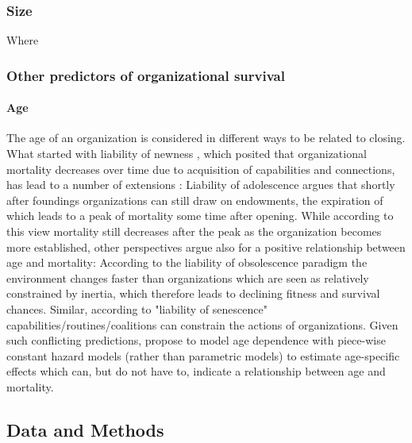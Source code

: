 \documentclass[12pt]{article}
\begin{document}
\subsubsection*{Size}


Where









\subsubsection*{Other predictors of organizational survival}

\paragraph*{Age}



The age of an organization is considered in different ways to be related to closing.
What started with liability of newness \parencite{Stinchcombe_1965_structure}, which posited that organizational mortality decreases over time due to acquisition of capabilities and connections, has lead to a number of extensions \parencite{Carroll_Khessina_2019_demography,Hannan_1998_mortality}:
Liability of adolescence argues that shortly after foundings organizations can still draw on endowments, the expiration of which leads to a peak of mortality some time after opening.
While according to this view mortality still decreases after the peak as the organization becomes more established, other perspectives argue also for a positive relationship between age and mortality:
According to the liability of obsolescence paradigm the environment changes faster than organizations which are seen as relatively constrained by inertia, which therefore leads to declining fitness and survival chances.
Similar, according to "liability of senescence" capabilities/routines/coalitions can constrain the actions of organizations.
Given such conflicting predictions, \textcite{Carroll_Khessina_2019_demography} propose to model age dependence with piece-wise constant hazard models (rather than parametric models) to estimate age-specific effects which can, but do not have to, indicate a relationship between age and mortality.




\subsection*{Data and Methods}
\end{document}

